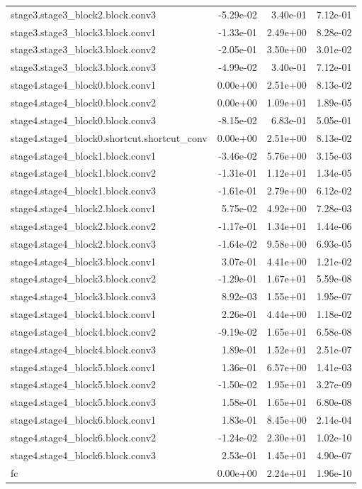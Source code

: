 \begin{longtable}{lrrr}
stage3.stage3_block2.block.conv3 & -5.29e-02 & 3.40e-01 & 7.12e-01 \\
stage3.stage3_block3.block.conv1 & -1.33e-01 & 2.49e+00 & 8.28e-02 \\
stage3.stage3_block3.block.conv2 & -2.05e-01 & 3.50e+00 & 3.01e-02 \\
stage3.stage3_block3.block.conv3 & -4.99e-02 & 3.40e-01 & 7.12e-01 \\
stage4.stage4_block0.block.conv1 & 0.00e+00 & 2.51e+00 & 8.13e-02 \\
stage4.stage4_block0.block.conv2 & 0.00e+00 & 1.09e+01 & 1.89e-05 \\
stage4.stage4_block0.block.conv3 & -8.15e-02 & 6.83e-01 & 5.05e-01 \\
stage4.stage4_block0.shortcut.shortcut_conv & 0.00e+00 & 2.51e+00 & 8.13e-02 \\
stage4.stage4_block1.block.conv1 & -3.46e-02 & 5.76e+00 & 3.15e-03 \\
stage4.stage4_block1.block.conv2 & -1.31e-01 & 1.12e+01 & 1.34e-05 \\
stage4.stage4_block1.block.conv3 & -1.61e-01 & 2.79e+00 & 6.12e-02 \\
stage4.stage4_block2.block.conv1 & 5.75e-02 & 4.92e+00 & 7.28e-03 \\
stage4.stage4_block2.block.conv2 & -1.17e-01 & 1.34e+01 & 1.44e-06 \\
stage4.stage4_block2.block.conv3 & -1.64e-02 & 9.58e+00 & 6.93e-05 \\
stage4.stage4_block3.block.conv1 & 3.07e-01 & 4.41e+00 & 1.21e-02 \\
stage4.stage4_block3.block.conv2 & -1.29e-01 & 1.67e+01 & 5.59e-08 \\
stage4.stage4_block3.block.conv3 & 8.92e-03 & 1.55e+01 & 1.95e-07 \\
stage4.stage4_block4.block.conv1 & 2.26e-01 & 4.44e+00 & 1.18e-02 \\
stage4.stage4_block4.block.conv2 & -9.19e-02 & 1.65e+01 & 6.58e-08 \\
stage4.stage4_block4.block.conv3 & 1.89e-01 & 1.52e+01 & 2.51e-07 \\
stage4.stage4_block5.block.conv1 & 1.36e-01 & 6.57e+00 & 1.41e-03 \\
stage4.stage4_block5.block.conv2 & -1.50e-02 & 1.95e+01 & 3.27e-09 \\
stage4.stage4_block5.block.conv3 & 1.58e-01 & 1.65e+01 & 6.80e-08 \\
stage4.stage4_block6.block.conv1 & 1.83e-01 & 8.45e+00 & 2.14e-04 \\
stage4.stage4_block6.block.conv2 & -1.24e-02 & 2.30e+01 & 1.02e-10 \\
stage4.stage4_block6.block.conv3 & 2.53e-01 & 1.45e+01 & 4.90e-07 \\
fc & 0.00e+00 & 2.24e+01 & 1.96e-10 \\
\end{longtable}

